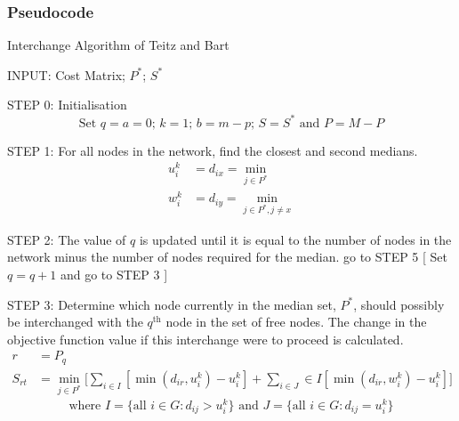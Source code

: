 \documentclass[11pt]{article}
\newcommand{\np}{\newpage}
\begin{document}
	\subsubsection{Pseudocode}
	\begin{algorithm}
		\caption{Interchange Algorithm of Teitz and Bart}
		\begin{algorithmic}[0]
			\Statex 
			\Statex INPUT: Cost Matrix; $P^*$; $S^*$
			
			\Statex 
			\Statex STEP 0: Initialisation 	
			\begin{equation*}
			\text{Set } q=a=0 \text{; } k=1 \text{; } b=m-p \text{; } S=S^* \text{ and } P = M - P
			\end{equation*}
			
			\Statex 
			\Statex STEP 1: For all nodes in the network, find the closest and second medians.
			\begin{align*}
			u_i^k &= d_{ix} = \min_{j\in P^*}\\
			w_i^k &= d_{iy} = \min_{j\in P^*, j\neq x}
			\end{align*} 
			
			\Statex	


			\Statex 
			\Statex STEP 2: The value of $q$ is updated until it is equal to the number of nodes in the network minus the number of nodes required for the median.
			\Statex go to STEP 5
			[
			\Else
			\Statex Set $q=q+1$ and go to STEP 3
			]
			\EndIf
			
			\Statex 
			\Statex STEP 3: Determine which node currently in the median set, $P^*$, should possibly be interchanged with the $q^{\text{th}}$ node in the set of free nodes.  The change in the objective function value if this interchange were to proceed is calculated.
			\begin{align*}
			r &= P_q\\
			S_{rt} & = \min_{j\in P^*}\big[\sum_{i\in I}[\min(d_{ir},u_i^k)-u_i^k] + \sum_{i\in J}\in I[\min(d_{ir},w_i^k)-u_i^k] \big]
			\end{align*}
			\begin{equation*}
			\text{where } I = \{\text{all } i \in G: d_{ij} > u_i^k\} \text{ and } J = \{\text{all } i \in G: d_{ij} = u_i^k\}
			\end{equation*}

		\end{algorithmic}
	\end{algorithm}
\np	
\end{document}
